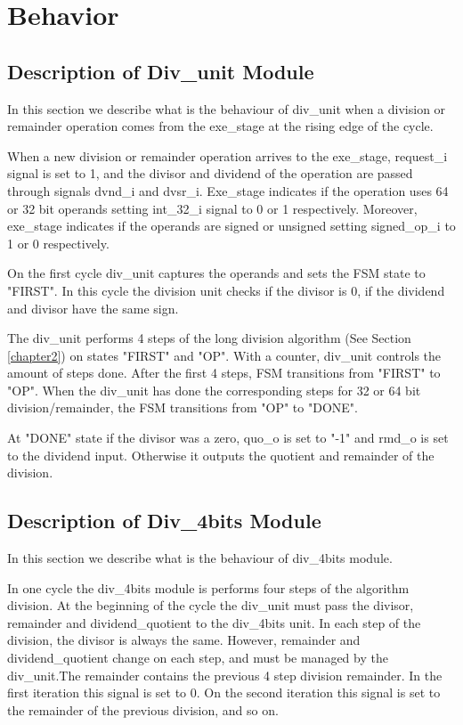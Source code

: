 \section{Behavior}

\subsection{Description of Div\_unit Module}

In this section we describe what is the behaviour of div\_unit when a division or remainder operation comes from the exe\_stage at the rising edge of the cycle. 

When a new division or remainder operation arrives to the exe\_stage, request\_i signal is set to 1, and the divisor and dividend of the operation are passed through signals dvnd\_i and dvsr\_i. Exe\_stage indicates if the operation uses 64 or 32 bit operands setting int\_32\_i signal to 0 or 1 respectively. Moreover, exe\_stage indicates if the operands are signed or unsigned setting signed\_op\_i to 1 or 0 respectively.

On the first cycle div\_unit captures the operands and sets the FSM state to "FIRST". In this cycle the division unit checks if the divisor is 0, if the dividend and divisor have the same sign.

The div\_unit performs 4 steps of the long division algorithm (See Section \ref{chapter2}) on states "FIRST" and "OP". With a counter, div\_unit controls the amount of steps done. After the first 4 steps, FSM transitions from "FIRST" to "OP". When the div\_unit has done the corresponding steps for 32 or 64 bit division/remainder, the FSM transitions from "OP" to "DONE".

At "DONE" state if the divisor was a zero, quo\_o is set to "-1" and rmd\_o is set to the dividend input. Otherwise it outputs the quotient and remainder of the division.



\subsection{Description of Div\_4bits Module}

In this section we describe what is the behaviour of div\_4bits module.

In one cycle the div\_4bits module is performs four steps of the algorithm division. At the beginning of the cycle the div\_unit must pass the divisor, remainder and dividend\_quotient to the div\_4bits unit. In each step of the division, the divisor is always the same. However, remainder and dividend\_quotient change on each step, and must be managed by the div\_unit.The remainder contains the previous 4 step division remainder. In the first iteration this signal is set to 0. On the second iteration this signal is set to the remainder of the previous division, and so on. 


